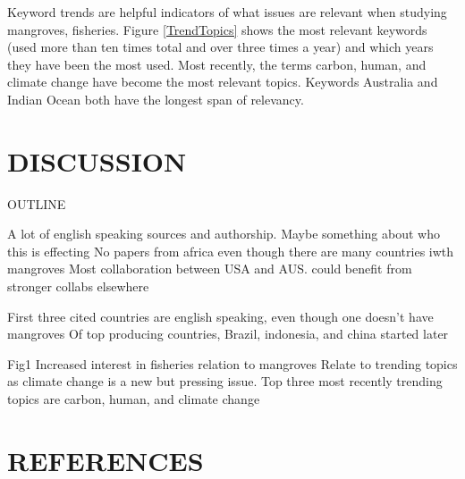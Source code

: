 \documentclass[
  12pt,
]{article}
\begin{document}
Keyword trends are helpful indicators of what issues are relevant when studying mangroves, fisheries. Figure \ref{TrendTopics} shows the most relevant keywords (used more than ten times total and over three times a year) and which years they have been the most used. Most recently, the terms carbon, human, and climate change have become the most relevant topics. Keywords Australia and Indian Ocean both have the longest span of relevancy.

\hypertarget{discussion}{%
\section{DISCUSSION}\label{discussion}}

OUTLINE

A lot of english speaking sources and authorship. Maybe something about who this is effecting
No papers from africa even though there are many countries iwth mangroves
Most collaboration between USA and AUS. could benefit from stronger collabs elsewhere

First three cited countries are english speaking, even though one doesn't have mangroves
Of top producing countries, Brazil, indonesia, and china started later

Fig1 Increased interest in fisheries relation to mangroves
Relate to trending topics as climate change is a new but pressing issue. Top three most recently trending topics are carbon, human, and climate change

\newpage

\hypertarget{references}{%
\section*{REFERENCES}\label{references}}
\end{document}
